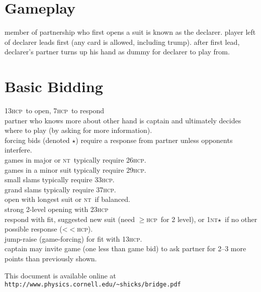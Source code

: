 \documentclass[landscape]{article}
\newcommand{\optionalmath}[1]{\ifmmode#1\else$#1$\fi}
\let\mathge\ge
\def\ge{\optionalmath\mathge}
\def\lt{\optionalmath<}
\def\NT{\ifmmode\mathsc{nt}\else\textsc{nt}\fi}
\def\HCP{\textsc{hcp}}
\def\f{\optionalmath\star}
\def\gf{\optionalmath\copyright}
\begin{document}
\begin{minipage}[t]{0.33\columnwidth}
\section{Gameplay}
member of partnership who first opens a suit is known as the
declarer.  player left of declarer leads first (any card is
allowed, including trump).  after first lead, declarer's partner
turns up his hand as dummy for declarer to play from.

\section{Basic Bidding}
13\HCP\ to open, 7\HCP\ to respond\\

partner who knows more about other hand is captain and ultimately
decides where to play (by asking for more information).\\

forcing bids (denoted \f) require a response from partner unless
opponents interfere.\\

games in major or \NT\ typically require 26\HCP.\\
games in a minor suit typically require 29\HCP.\\
small slams typically require 33\HCP.\\
grand slams typically require 37\HCP.\\

open with longest suit or \NT\ if balanced.\\
strong 2-level opening with 23\HCP\\

respond with fit, suggested new suit (need \ge10\HCP\ for 2 level),
or 1\NT \f\ if no other possible response (\lt10\HCP).\\
jump-raise (game-forcing) for fit with 13\HCP.\\
captain may invite game (one less than game bid) to ask partner
for 2--3 more points than previously shown.
\end{minipage}

\vskip 1pc
This document is available online at 
\verb!http://www.physics.cornell.edu/~shicks/bridge.pdf!

\eject
\end{document}
